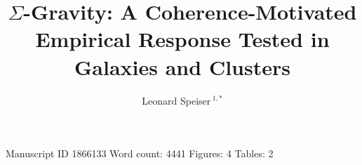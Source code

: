 \documentclass[utf8]{FrontiersinHarvard}
\def\firstAuthorLast{Speiser}
\def\Authors{Leonard Speiser\,$^{1,*}$}
\begin{document}
\onecolumn
{}
\title[$\Sigma$-Gravity]{$\Sigma$-Gravity: A Coherence-Motivated Empirical Response Tested in Galaxies and Clusters}
\author[\firstAuthorLast]{\Authors}
\address{}
\correspondance{}
\extraAuth{}
\maketitle

\begin{center}
\small Manuscript ID 1866133 \quad Word count: 4441 \quad Figures: 4 \quad Tables: 2
\end{center}

\begin{abstract}
\section{}

\end{abstract}
\end{document}
